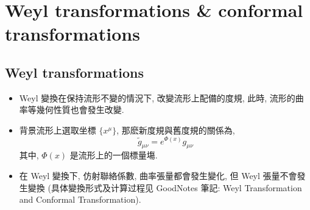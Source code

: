 \section{Weyl transformations \& conformal transformations}
\subsection{Weyl transformations}
\begin{itemize}
	\item Weyl 變換在保持流形不變的情況下, 改變流形上配備的度規, 此時, 流形的曲率等幾何性質也會發生改變.
	
	\item 背景流形上選取坐標 $\{ x^\mu \}$, 那麽新度規與舊度規的關係為,
	\begin{equation}
		\tilde{g}_{\mu \nu} = e^{\Phi(x)} g_{\mu \nu}
	\end{equation}
	其中, $\Phi(x)$ 是流形上的一個標量塲.
	
	\item 在 Weyl 變換下, 仿射聯絡係數, 曲率張量都會發生變化, 但 Weyl 張量不會發生變換 (具体變換形式及计算过程见 GoodNotes 筆記: Weyl Transformation and Conformal Transformation).
\end{itemize}

